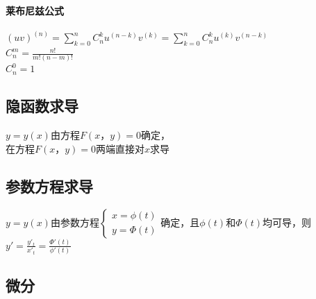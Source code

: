 \documentclass{article}
\begin{document}
\begin{flushleft}
	\paragraph{莱布尼兹公式}
	$(uv)^{(n)} = \sum\limits_{k=0}^{n} C_n^k u^{(n-k)} v^{(k)} = \sum\limits_{k=0}^{n} C_n^k u^{(k)} v^{(n-k)}$\\
	$C_n^m=\frac{n!}{m!(n-m)!}$\\
	$C_n^0=1$\\
	
	\subsection{隐函数求导}
	
	$y=y(x)$由方程$F(x，y)=0$确定，\\
	在方程$F(x，y)=0$两端直接对$x$求导\\
	
	\subsection{参数方程求导}
	
	$y=y(x)$由参数方程$\left\{
	\begin{array}{rcl}
	x=\phi(t)\\
	y=\Phi(t)
	\end{array} \right.$确定，且$\phi(t)$和$\Phi(t)$均可导，则$y'=\frac{y'_t}{x'_t}=\frac{\Phi'(t)}{\phi'(t)}$\\
	
	\subsection{微分}
	

\end{flushleft}
\end{document}
